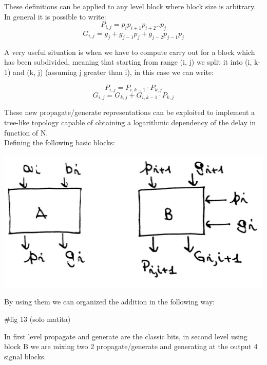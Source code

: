 These definitions can be applied to any level block where block size is arbitrary. In general it is possible to write:
$$P_{i,j}=p_ip_{i+1}p_{i+2}..p_{j}$$
$$G_{i,j}=g_j+g_{j-1}p_j+g_{j-2}p_{j-1}p_j$$

A very useful situation is when we have to compute carry out for a block which has been subdivided, meaning that starting from range (i, j) we split it into (i, k-1) and (k, j) (assuming j greater than i), in this case we can write:

$$P_{i,j}=P_{i, k-1} \cdot P_{k, j}$$
$$ G_{i, j}=G_{k, j}+G_{i, k-1}\cdot P_{k, j}$$

These new propagate/generate representations can be exploited to implement a tree-like topology capable of obtaining a logarithmic dependency of the delay in function of N.\\

Defining the following basic blocks:

\begin{center}
  \includegraphics[width=0.6\linewidth]{img/img2/12}
\end{center}

By using them we can organized the addition in the following way:

 $\#$fig 13 (solo matita)

In first level propagate and generate are the classic bits, in second level using block B we are mixing two 2 propagate/generate and generating at the output 4 signal blocks.

